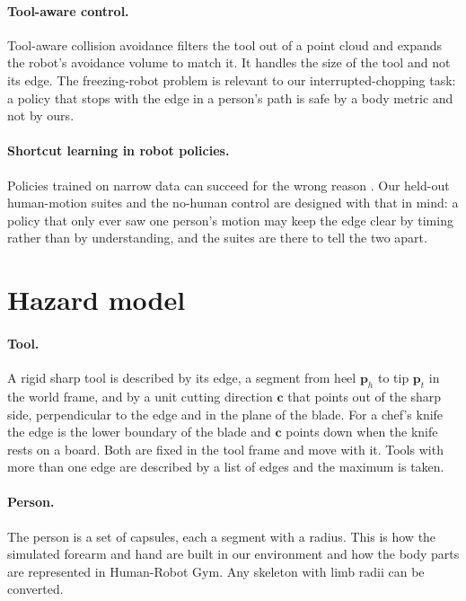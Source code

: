 \documentclass[11pt,letterpaper]{article}
\begin{document}
\paragraph{Tool-aware control.}
Tool-aware collision avoidance \cite{toolaware2025collision} filters the tool out of a point cloud and expands the robot's avoidance volume to match it. It handles the size of the tool and not its edge. The freezing-robot problem \cite{trautman2010unfreezing} is relevant to our interrupted-chopping task: a policy that stops with the edge in a person's path is safe by a body metric and not by ours.

\paragraph{Shortcut learning in robot policies.}
Policies trained on narrow data can succeed for the wrong reason \cite{geirhos2020shortcut,xing2025shortcut,wen2020copycat}. Our held-out human-motion suites and the no-human control are designed with that in mind: a policy that only ever saw one person's motion may keep the edge clear by timing rather than by understanding, and the suites are there to tell the two apart.

\section{Hazard model}
\label{sec:hazard}
\paragraph{Tool.}
A rigid sharp tool is described by its edge, a segment from heel $\mathbf{p}_h$ to tip $\mathbf{p}_t$ in the world frame, and by a unit cutting direction $\mathbf{c}$ that points out of the sharp side, perpendicular to the edge and in the plane of the blade. For a chef's knife the edge is the lower boundary of the blade and $\mathbf{c}$ points down when the knife rests on a board. Both are fixed in the tool frame and move with it. Tools with more than one edge are described by a list of edges and the maximum is taken.

\paragraph{Person.}
The person is a set of capsules, each a segment with a radius. This is how the simulated forearm and hand are built in our environment and how the body parts are represented in Human-Robot Gym. Any skeleton with limb radii can be converted.
\end{document}
